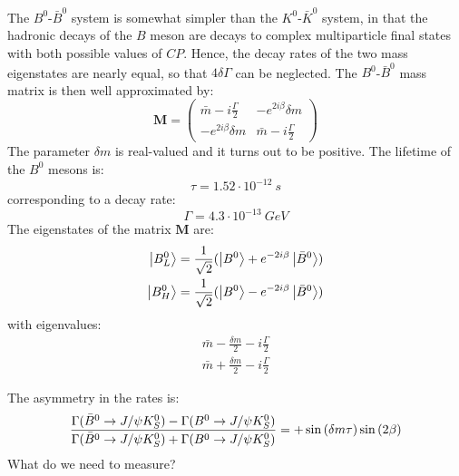 \documentclass[../../main/main.tex]{subfiles}
\begin{document}
The \( B^0 \)-\( \bar{B}^0 \) system is somewhat simpler than the \( K^0 \)-\( \bar{K}^0 \) system, in that the hadronic decays of the \( B \) meson are decays to complex multiparticle final states with both possible values of \( CP \). Hence, the decay rates of the two mass eigenstates are nearly equal, so that \( 4 \delta \Gamma \) can be neglected. The \( B^0 \)-\( \bar{B}^0 \) mass matrix is then well approximated by:
\begin{equation}
	\mathbf{M}
	=
	\begin{pmatrix}
		\bar{m} - i \frac{\Gamma}{2}	&	- e^{2 i \beta} \delta m	\\
		- e^{2 i \beta} \delta m	&	\bar{m} - i \frac{\Gamma}{2}
	\end{pmatrix}
	\label{eq:}
\end{equation}
The parameter \( \delta m \) is real-valued and it turns out to be positive. The lifetime of the \( B^0 \) mesons is:
\begin{equation}
	\tau
	=
	1.52 \cdot 10^{-12} \ \si{s}
	\label{eq:}
\end{equation}
corresponding to a decay rate:
\begin{equation}
	\Gamma
	=
	4.3 \cdot 10^{-13} \ \si{GeV}
	\label{eq:}
\end{equation}
The eigenstates of the matrix \( \mathbf{M} \) are:
\begin{align}
	\ket{B^0_L}	&= \frac{1}{\sqrt{2}} ( \ket{B^0} + e^{-2i\beta} \ket{\bar{B}^0} )	\\
	\ket{B^0_H}	&= \frac{1}{\sqrt{2}} ( \ket{B^0} - e^{-2i\beta} \ket{\bar{B}^0} )
\end{align}
with eigenvalues:
\begin{align}
	\bar{m} - \frac{\delta m}{2} - i \frac{\Gamma}{2}	\\
	\bar{m} + \frac{\delta m}{2} - i \frac{\Gamma}{2}
\end{align}


The asymmetry in the rates is:
\begin{equation}
	\frac{\Gamma(\bar{B}^0 \rightarrow J/\psi K^0_S) - \Gamma(B^0 \rightarrow J/\psi K^0_S)}{\Gamma(\bar{B}^0 \rightarrow J/\psi K^0_S) + \Gamma(B^0 \rightarrow J/\psi K^0_S)}
	=
	+ \sin \qty(\delta m \tau) \sin \qty(2 \beta)
	\label{eq:}
\end{equation}
What do we need to measure?
\end{document}
